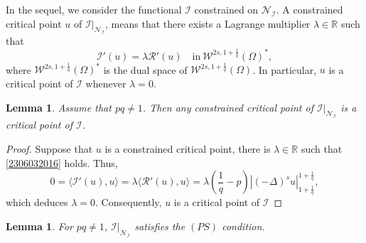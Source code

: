 \documentclass[10pt]{article}
\numberwithin{equation}{section}
\newtheorem{lemma}[theorem]{Lemma}
\numberwithin{equation}{section}
\begin{document}
In the sequel, we consider the functional $\mathcal{I}$ constrained on $\mathcal{N}_\mathcal{I}$.
A constrained critical point $u$ of $\mathcal{I}|_{\mathcal{N}_\mathcal{I}}$, means that there exists a Lagrange multiplier $\lambda\in \mathbb{R}$ such that
\begin{equation}\label{2306032016}
\mathcal{I}'(u)=\lambda \mathcal{R}'(u) \quad \text{in}~\mathcal{W}^{2s, 1+\frac1q}(\Omega)^*,
\end{equation}
where $\mathcal{W}^{2s, 1+\frac1q}(\Omega)^*$ is the dual space of $\mathcal{W}^{2s, 1+\frac1q}(\Omega)$. In particular, $u$ is a critical point of $\mathcal{I}$ whenever $\lambda=0$.
\begin{lemma}\label{2306122343}
Assume that $pq\neq 1$. Then any constrained critical point of $\mathcal{I}|_{\mathcal{N}_\mathcal{I}}$ is a critical point of $\mathcal{I}$.
\end{lemma}
\begin{proof}
Suppose that $u$ is a constrained critical point, there is $\lambda\in\mathbb{R}$ such that \eqref{2306032016} holds. Thus,
\begin{equation}\label{2305192023}
0=\langle \mathcal{I}'(u), u \rangle=\lambda  \langle \mathcal{R}'(u), u\rangle=\lambda \left(\frac{1}{q}-p\right)\left|(-\Delta)^su\right|_{1+\frac1q}^{1+\frac1q},
\end{equation}
which deduces $\lambda=0$. Consequently, $u$ is a critical point of $\mathcal{I}$
\end{proof}
\begin{lemma}\label{2306031956}
For $pq\neq 1$, $\mathcal{I}|_{\mathcal{N}_\mathcal{I}}$ satisfies the $(PS)$ condition.
\end{lemma}
\end{document}
